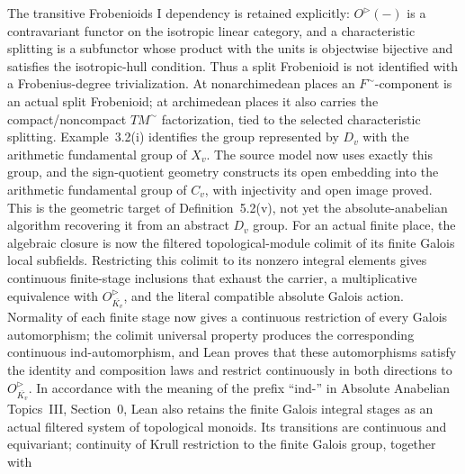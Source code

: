 \begin{definition}
  \leanok
  The transitive Frobenioids I dependency is retained explicitly:
  \(O^\triangleright(-)\) is a contravariant functor on the isotropic
  linear category, and a characteristic splitting is a subfunctor whose
  product with the units is objectwise bijective and satisfies the
  isotropic-hull condition.  Thus a split Frobenioid is not identified with
  a Frobenius-degree trivialization.  At nonarchimedean places an
  \(F^{\sim}\)-component is an actual split Frobenioid; at archimedean
  places it also carries the compact/noncompact \(TM^{\sim}\)
  factorization, tied to the selected characteristic splitting.
  Example~3.2(i) identifies the group represented by \(D_v\) with the
  arithmetic fundamental group of \(X_v\).  The source model now uses exactly
  this group, and the sign-quotient geometry constructs its open embedding
  into the arithmetic fundamental group of \(C_v\), with injectivity and open
  image proved.  This is the geometric target of Definition~5.2(v), not yet
  the absolute-anabelian algorithm recovering it from an abstract \(D_v\)
  group.
  For an actual finite place, the algebraic closure is now the filtered
  topological-module colimit of its finite Galois local subfields.  Restricting
  this colimit to its nonzero integral elements gives continuous finite-stage
  inclusions that exhaust the carrier, a multiplicative equivalence with
  \(O_{\overline{K_v}}^\triangleright\), and the literal compatible absolute
  Galois action.  Normality of each finite stage now gives a continuous
  restriction of every Galois automorphism; the colimit universal property
  produces the corresponding continuous ind-automorphism, and Lean proves
  that these automorphisms satisfy the identity and composition laws and
  restrict continuously in both directions to
  \(O_{\overline{K_v}}^\triangleright\).  In accordance with the meaning of
  the prefix ``ind-'' in Absolute Anabelian Topics~III, Section~0, Lean also
  retains the finite Galois integral stages as an actual filtered system of
  topological monoids.  Its transitions are continuous and equivariant;
  continuity of Krull restriction to the finite Galois group, together with

\end{definition}
